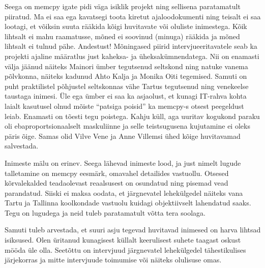 Seega on memcpy igate pidi väga isiklik projekt ning sellisena paratamatult 
piiratud. Ma ei saa ega kavatsegi toota kiretut ajaloodokumenti ning teisalt ei saa lootagi, et võiksin suuta rääkida kõigi 
huvitavate või oluliste inimestega. Kõik lihtsalt ei mahu raamatusse, mõned ei 
soovinud (minuga) rääkida ja mõned lihtsalt ei tulnud pähe. Andestust! 
Mõningased piirid intervjueeritavatele seab ka projekti ajaline määratlus just 
kaheksa- ja üheksakümnendatega. Nii on enamasti välja jäänud näiteks 
Mainori ümber tegutsenud seltskond ning natuke vanema põlvkonna, 
näiteks kadunud Ahto Kalja ja Monika 
Oiti tegemised. Samuti on puht praktilistel põhjustel 
seltskonnas vähe Tartus tegutsenud ning venekeelse taustaga inimesi. Üle ega 
ümber ei saa ka asjaolust, et kunagi IT-rahva kohta laialt kasutusel olnud 
mõiste \enquote{patsiga poisid} ka memcpy-s otsest peegeldust leiab. Enamasti 
on tõesti tegu poistega. Kahju küll, aga uuritav kogukond paraku oli 
ebaproportsionaalselt maskuliinne ja selle teistsugusena kujutamine ei oleks 
päris õige. Samas olid Vilve Vene ja Anne 
Villemsi ühed kõige huvitavamad salvestada.

Inimeste mälu on erinev. Seega lähevad inimeste lood, ja just nimelt lugude 
talletamine on memcpy eesmärk, omavahel detailides vastuollu. Otsesed 
kõrvalekalded teadaolevast reaalsusest on osundatud ning pisemad vead 
parandatud. Siiski ei maksa oodata, et järgnevatel lehekülgedel näiteks vana 
Tartu ja Tallinna koolkondade vastuolu kuidagi objektiivselt lahendatud saaks. 
Tegu on lugudega ja neid tuleb paratamatult võtta tera soolaga.

Samuti tuleb arvestada, et suuri asju tegevad huvitavad inimesed on harva 
lihtsad isiksused. Olen üritanud kunagisest küllalt keerulisest suhete taagast 
oskust mööda üle olla. Seetõttu on intervjuud järgnevatel lehekülgedel 
tähestikulises järjekorras ja mitte intervjuude toimumise või näiteks olulisuse 
omas. 

